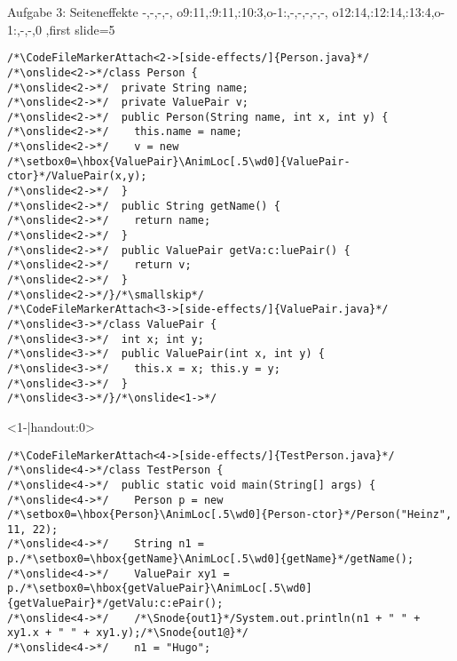 {\begin{frame}[fragile,t]{Aufgabe 3: Seiteneffekte}
{{    -,-,-,-, %
    o9:{11},:9:{11},:10:{3},o-1:{},-,-,-,-,-, %
    o12:{14},:12:{14},:13:{4},o-1:{},-,-,0
},first slide=5}
\begin{verbatim}
/*\CodeFileMarkerAttach<2->[side-effects/]{Person.java}*/
/*\onslide<2->*/class Person {
/*\onslide<2->*/  private String name;
/*\onslide<2->*/  private ValuePair v;
/*\onslide<2->*/  public Person(String name, int x, int y) {
/*\onslide<2->*/    this.name = name;
/*\onslide<2->*/    v = new /*\setbox0=\hbox{ValuePair}\AnimLoc[.5\wd0]{ValuePair-ctor}*/ValuePair(x,y);
/*\onslide<2->*/  }
/*\onslide<2->*/  public String getName() {
/*\onslide<2->*/    return name;
/*\onslide<2->*/  }
/*\onslide<2->*/  public ValuePair getVa:c:luePair() {
/*\onslide<2->*/    return v;
/*\onslide<2->*/  }
/*\onslide<2->*/}/*\smallskip*/
/*\CodeFileMarkerAttach<3->[side-effects/]{ValuePair.java}*/
/*\onslide<3->*/class ValuePair {
/*\onslide<3->*/  int x; int y;
/*\onslide<3->*/  public ValuePair(int x, int y) {
/*\onslide<3->*/    this.x = x; this.y = y;
/*\onslide<3->*/  }
/*\onslide<3->*/}/*\onslide<1->*/
\end{verbatim}
\endAnimateCode
{}
\begin{onlyenv}<1-|handout:0>
\begin{verbatim}
/*\CodeFileMarkerAttach<4->[side-effects/]{TestPerson.java}*/
/*\onslide<4->*/class TestPerson {
/*\onslide<4->*/  public static void main(String[] args) {
/*\onslide<4->*/    Person p = new /*\setbox0=\hbox{Person}\AnimLoc[.5\wd0]{Person-ctor}*/Person("Heinz", 11, 22);
/*\onslide<4->*/    String n1 = p./*\setbox0=\hbox{getName}\AnimLoc[.5\wd0]{getName}*/getName();
/*\onslide<4->*/    ValuePair xy1 = p./*\setbox0=\hbox{getValuePair}\AnimLoc[.5\wd0]{getValuePair}*/getValu:c:ePair();
/*\onslide<4->*/    /*\Snode{out1}*/System.out.println(n1 + " " + xy1.x + " " + xy1.y);/*\Snode{out1@}*/
/*\onslide<4->*/    n1 = "Hugo";

\end{verbatim}
\end{onlyenv}
\end{frame}}
